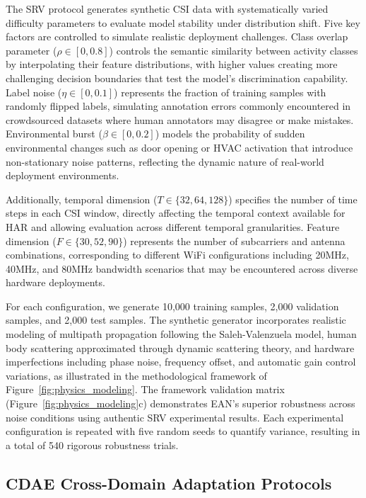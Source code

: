 \documentclass[lettersize,journal]{IEEEtran}
\begin{document}
The SRV protocol generates synthetic CSI data with systematically varied difficulty parameters to evaluate model stability under distribution shift. Five key factors are controlled to simulate realistic deployment challenges. Class overlap parameter ($\rho \in [0, 0.8]$) controls the semantic similarity between activity classes by interpolating their feature distributions, with higher values creating more challenging decision boundaries that test the model's discrimination capability. Label noise ($\eta \in [0, 0.1]$) represents the fraction of training samples with randomly flipped labels, simulating annotation errors commonly encountered in crowdsourced datasets where human annotators may disagree or make mistakes. Environmental burst ($\beta \in [0, 0.2]$) models the probability of sudden environmental changes such as door opening or HVAC activation that introduce non-stationary noise patterns, reflecting the dynamic nature of real-world deployment environments.

Additionally, temporal dimension ($T \in \{32, 64, 128\}$) specifies the number of time steps in each CSI window, directly affecting the temporal context available for HAR and allowing evaluation across different temporal granularities. Feature dimension ($F \in \{30, 52, 90\}$) represents the number of subcarriers and antenna combinations, corresponding to different WiFi configurations including 20MHz, 40MHz, and 80MHz bandwidth scenarios that may be encountered across diverse hardware deployments.

For each configuration, we generate 10,000 training samples, 2,000 validation samples, and 2,000 test samples. The synthetic generator incorporates realistic modeling of multipath propagation following the Saleh-Valenzuela model, human body scattering approximated through dynamic scattering theory, and hardware imperfections including phase noise, frequency offset, and automatic gain control variations, as illustrated in the methodological framework of Figure~\ref{fig:physics_modeling}. The framework validation matrix (Figure~\ref{fig:physics_modeling}c) demonstrates EAN's superior robustness across noise conditions using authentic SRV experimental results. Each experimental configuration is repeated with five random seeds to quantify variance, resulting in a total of 540 rigorous robustness trials.

\subsection{CDAE Cross-Domain Adaptation Protocols}
\end{document}
